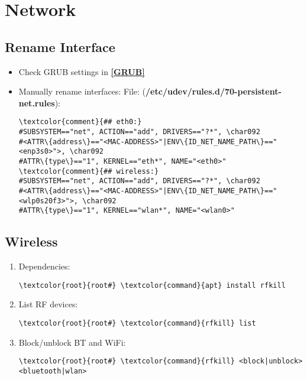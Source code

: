 \documentclass[10pt, a4paper, onecolumn, openany]{book} %
\begin{document}
\chapter{Network}
\section{Rename Interface}
\begin{itemize}
    \item Check GRUB settings in \underline{\textbf{\ref{GRUB}}}
    \item Manually rename interfaces:
\newline File: (\textcolor{file}{\textbf{/etc/udev/rules.d/70-persistent-net.rules}}):
\begin{Verbatim}[commandchars=\\\{\}]
\textcolor{comment}{## eth0:}
#SUBSYSTEM=="net", ACTION=="add", DRIVERS=="?*", \char092
#<ATTR\{address\}=="<MAC-ADDRESS>"|ENV\{ID_NET_NAME_PATH\}=="<enp3s0>">, \char092
#ATTR\{type\}=="1", KERNEL=="eth*", NAME="<eth0>"
\textcolor{comment}{## wireless:}
#SUBSYSTEM=="net", ACTION=="add", DRIVERS=="?*", \char092
#<ATTR\{address\}=="<MAC-ADDRESS>"|ENV\{ID_NET_NAME_PATH\}=="<wlp0s20f3>">, \char092
#ATTR\{type\}=="1", KERNEL=="wlan*", NAME="<wlan0>"
\end{Verbatim}
\end{itemize}
\section{Wireless}
\begin{enumerate}
    \item Dependencies:
\begin{Verbatim}[commandchars=\\\{\}]
\textcolor{root}{root#} \textcolor{command}{apt} install rfkill
\end{Verbatim}
    \item List RF devices:
\begin{Verbatim}[commandchars=\\\{\}]
\textcolor{root}{root#} \textcolor{command}{rfkill} list
\end{Verbatim}
    \item Block/unblock BT and WiFi:
\begin{Verbatim}[commandchars=\\\{\}]
\textcolor{root}{root#} \textcolor{command}{rfkill} <block|unblock> <bluetooth|wlan>
\end{Verbatim}
\end{enumerate}
\end{document}

